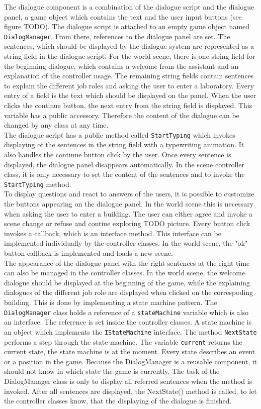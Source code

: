 The dialogue component is a combination of the dialogue script and the dialogue panel, a game object which contains the text and the user input buttons (see figure TODO). The dialogue script is attached to an empty game object named \texttt{DialogManager}. From there, references to the dialogue panel are set. The sentences, which should be displayed by the dialogue system are represented as a string field in the dialogue script. For the world scene, there is one string field for the beginning dialogue, which contains a welcome from the assistant and an explanation of the controller usage. The remaining string fields contain sentences to explain the different job roles and asking the user to enter a laboratory. Every entry of a field is the text which should be displayed on the panel. When the user clicks the continue button, the next entry from the string field is displayed. This variable has a public accessory. Therefore the content of the dialogue can be changed by any class at any time. \\
The dialogue script has a public method called \texttt{StartTyping} which invokes displaying of the sentences in the string field with a typewriting animation. It also handles the continue button click by the user. Once every sentence is displayed, the dialogue panel disappears automatically. In the scene controller class, it is only necessary to set the content of the sentences and to invoke the \texttt{StartTyping} method. \\
To display questions and react to answers of the users, it is possible to customize the buttons appearing on the dialogue panel. In the world scene this is necessary when asking the user to enter a building. The user can either agree and invoke a scene change or refuse and contiue exploring TODO picture. Every button click invokes a callback, which is an interface method. This interface can be implemented individually by the controller classes. In the world scene, the "ok" button callback is implemented and loads a new scene. \\The appearance of the dialogue panel with the right sentences at the right time can also be managed in the controller classes. In the world scene, the welcome dialogue should be displayed at the beginning of the game, while the explaining dialogues of the different job role are displayed when clicked on the correspoding building. This is done by implementing a state machine pattern. The \texttt{DialogManager} class holds a reference of a \texttt{stateMachine} variable which is also an interface. The reference is set inside the controller classes. A state machine is an object which implements the \texttt{IStateMachine} interface. The method \texttt{NextState} performs a step through the state machine. The variable \texttt{current} returns the current state, the state machine is at the moment. Every state describes an event or a position in the game. Because the DialogManager is a reusable component, it should not know in which state the game is currently. The task of the DialogManager class is only to display all referred sentences when the method is invoked. After all sentences are displayed, the NextState() method is called, to let the controller classes know, that the displaying of the dialogue is finished. 

